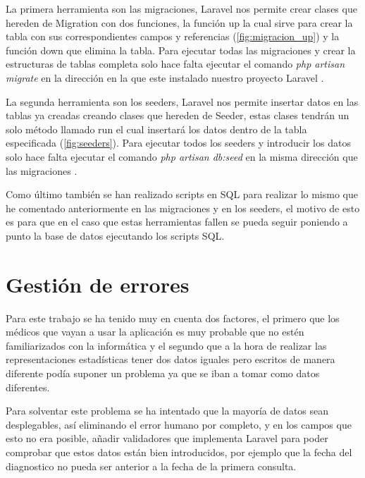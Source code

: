 La primera herramienta son las migraciones, Laravel nos permite crear clases que hereden de Migration con dos funciones, la función up la cual sirve para crear la tabla con sus correspondientes campos y referencias (\ref{fig:migracion_up}) y la función down que elimina la tabla. Para ejecutar todas las migraciones y crear la estructuras de tablas completa solo hace falta ejecutar el comando \textit{php artisan migrate} en la dirección en la que este instalado nuestro proyecto Laravel \cite{migraciones}.


La segunda herramienta son los seeders, Laravel nos permite insertar datos en las tablas ya creadas creando clases que hereden de Seeder, estas clases tendrán un solo método llamado run el cual insertará los datos dentro de la tabla especificada (\ref{fig:seeders}). Para ejecutar todos los seeders y introducir los datos solo hace falta ejecutar el comando \textit{php artisan db:seed}  en la misma dirección que las migraciones \cite{seeders}. 


Como último también se han realizado scripts en SQL para realizar lo mismo que he comentado anteriormente en las migraciones y en los seeders, el motivo de esto es para que en el caso que estas herramientas fallen se pueda seguir poniendo a punto la base de datos ejecutando los scripts SQL.

\section{Gestión de errores}

Para este trabajo se ha tenido muy en cuenta dos factores, el primero que los médicos que vayan a usar la aplicación es muy probable que no estén familiarizados con la informática y el segundo que a la hora de realizar las representaciones estadísticas tener dos datos iguales pero escritos de manera diferente podía suponer un problema ya que se iban a tomar como datos diferentes.

Para solventar este problema se ha intentado que la mayoría de datos sean desplegables, así eliminando el error humano por completo, y en los campos que esto no era posible, añadir validadores que implementa Laravel para poder comprobar que estos datos están bien introducidos, por ejemplo que la fecha del diagnostico no pueda ser anterior a la fecha de la primera consulta. 

